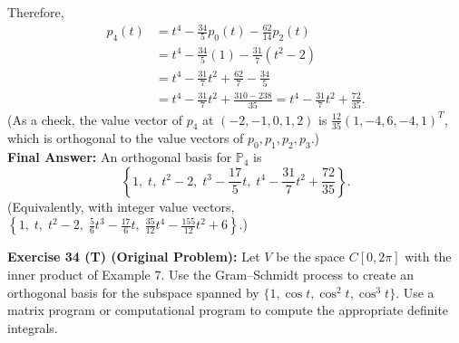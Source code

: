 \documentclass[11pt, letterpaper]{article}
\theoremstyle{definition}
\theoremstyle{remark}
\begin{document}
Therefore,
\begin{align*}
    p_4(t) &= t^4 - \frac{34}{5}p_0(t) - \frac{62}{14}p_2(t) \\
    &= t^4 - \frac{34}{5}(1) - \frac{31}{7}(t^2 - 2) \\
    &= t^4 - \frac{31}{7}t^2 + \frac{62}{7} - \frac{34}{5} \\
    &= t^4 - \frac{31}{7}t^2 + \frac{310 - 238}{35} = t^4 - \frac{31}{7}t^2 + \frac{72}{35}.
\end{align*}
(As a check, the value vector of $p_4$ at $(-2,-1,0,1,2)$ is $\frac{12}{35}(1, -4, 6, -4, 1)^T$, which is orthogonal to the value vectors of $p_0, p_1, p_2, p_3$.)\\
\textbf{Final Answer:} An orthogonal basis for $\mathbb{P}_4$ is
\[
    \left\{1,\; t,\; t^2 - 2,\; t^3 - \frac{17}{5}t,\; t^4 - \frac{31}{7}t^2 + \frac{72}{35}\right\}.
\]
(Equivalently, with integer value vectors, $\left\{1,\; t,\; t^2 - 2,\; \frac{5}{6}t^3 - \frac{17}{6}t,\; \frac{35}{12}t^4 - \frac{155}{12}t^2 + 6\right\}$.)

\textbf{Exercise 34 (T) (Original Problem):} Let $V$ be the space $C[0, 2\pi]$ with the inner product of Example 7. Use the Gram--Schmidt process to create an orthogonal basis for the subspace spanned by $\{1, \cos t, \cos^2 t, \cos^3 t\}$. Use a matrix program or computational program to compute the appropriate definite integrals.
\end{document}
